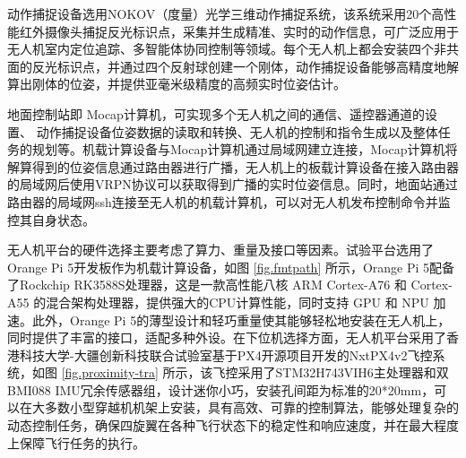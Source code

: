 \documentclass[lang=chs, degree=master, blindreview=true, winfonts=true]{yanputhesis}
\begin{document}
动作捕捉设备选用NOKOV（度量）光学三维动作捕捉系统，该系统采用20个高性能红外摄像头捕捉反光标识点，采集并生成精准、实时的动作信息，可广泛应用于无人机室内定位追踪、多智能体协同控制等领域。每个无人机上都会安装四个非共面的反光标识点，并通过四个反射球创建一个刚体，动作捕捉设备能够高精度地解算出刚体的位姿，并提供亚毫米级精度的高频实时位姿估计。

地面控制站即 Mocap计算机，可实现多个无人机之间的通信、遥控器通道的设置、 动作捕捉设备位姿数据的读取和转换、无人机的控制和指令生成以及整体任务的规划等。机载计算设备与Mocap计算机通过局域网建立连接，Mocap计算机将解算得到的位姿信息通过路由器进行广播，无人机上的板载计算设备在接入路由器的局域网后使用VRPN协议可以获取得到广播的实时位姿信息。同时，地面站通过路由器的局域网ssh连接至无人机的机载计算机，可以对无人机发布控制命令并监控其自身状态。

无人机平台的硬件选择主要考虑了算力、重量及接口等因素。试验平台选用了Orange Pi 5开发板作为机载计算设备，如图 \ref{fig.fmtpath} 所示，Orange Pi 5配备了Rockchip RK3588S处理器，这是一款高性能八核 ARM Cortex-A76 和 Cortex-A55 的混合架构处理器，提供强大的CPU计算性能，同时支持 GPU 和 NPU 加速。此外，Orange Pi 5的薄型设计和轻巧重量使其能够轻松地安装在无人机上，同时提供了丰富的接口，适配多种外设。在下位机选择方面，无人机平台采用了香港科技大学-大疆创新科技联合试验室基于PX4开源项目开发的NxtPX4v2飞控系统，如图 \ref{fig.proximity-tra} 所示，该飞控采用了STM32H743VIH6主处理器和双BMI088 IMU冗余传感器组，设计迷你小巧，安装孔间距为标准的20*20mm，可以在大多数小型穿越机机架上安装，具有高效、可靠的控制算法，能够处理复杂的动态控制任务，确保四旋翼在各种飞行状态下的稳定性和响应速度，并在最大程度上保障飞行任务的执行。
\end{document}
